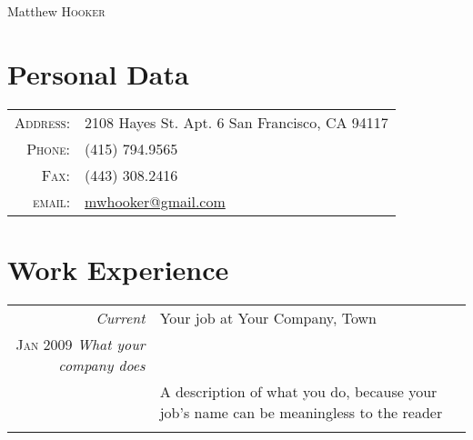 \documentclass[10pt]{article}
\begin{document}
\pagestyle{empty} %


\par{\centering
{\Huge Matthew \textsc{Hooker} }
\bigskip\par}

\section{Personal Data}
\begin{tabular}{rl}
\textsc{Address:}   & 2108 Hayes St. Apt. 6 San Francisco, CA 94117\\
\textsc{Phone:} & (415) 794.9565\\
\textsc{Fax:} & (443) 308.2416\\
\textsc{email:} & \href{mailto:mwhooker@gmail.com}{mwhooker@gmail.com}\\
\end{tabular}


\section{Work Experience}
\begin{tabular}{r|p{11cm}}
\emph{Current} & Your job at Your Company, Town \\
\textsc{Jan 2009} \emph{What your company does} \\
& \footnotesize{A description of what you do,
because your job's name can be meaningless to the reader}\\
\multicolumn{2}{c}{}\ %
\end{tabular}
\end{document}
